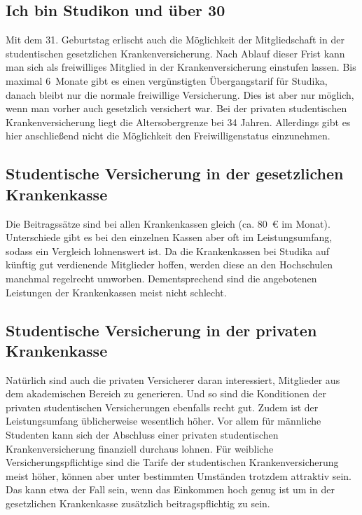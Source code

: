 \subsection*{Ich bin Studikon und über 30}

Mit dem 31. Geburtstag erlischt auch die Möglichkeit der
Mitgliedschaft in der studentischen gesetzlichen
Krankenversicherung. Nach Ablauf dieser Frist kann man sich 
als freiwilliges Mitglied in der Krankenversicherung einstufen lassen. 
Bis maximal 6~Monate gibt es einen vergünstigten Übergangstarif für
Studika, danach bleibt nur die normale freiwillige Versicherung.
Dies ist aber nur möglich, wenn
man vorher auch gesetzlich versichert war. Bei der privaten
studentischen Krankenversicherung liegt die Altersobergrenze bei 34
Jahren. Allerdings gibt es hier anschließend nicht die Möglichkeit den
Freiwilligenstatus einzunehmen.

\subsection*{Studentische Versicherung in der gesetzlichen Krankenkasse}

Die Beitragssätze sind bei allen Krankenkassen gleich (ca. 80~€ im
Monat). Unterschiede gibt es bei den einzelnen Kassen aber oft im
Leistungsumfang, sodass ein Vergleich lohnenswert ist. Da die Krankenkassen bei
Studika auf künftig gut verdienende Mitglieder hoffen, werden
diese an den Hochschulen manchmal regelrecht umworben. Dementsprechend
sind die angebotenen Leistungen der Krankenkassen meist nicht
schlecht.

\subsection*{Studentische Versicherung in der privaten Krankenkasse}

Natürlich sind auch die privaten Versicherer daran interessiert,
Mitglieder aus dem akademischen Bereich zu generieren. Und so sind die
Konditionen der privaten studentischen Versicherungen ebenfalls recht gut. Zudem ist der
Leistungsumfang üblicherweise wesentlich höher. Vor allem für
männliche Studenten kann sich der Abschluss einer privaten
studentischen Krankenversicherung finanziell durchaus lohnen. Für weibliche
Versicherungspflichtige sind die Tarife der
studentischen Krankenversicherung meist höher, können aber unter
bestimmten Umständen trotzdem attraktiv sein. Das kann etwa der Fall
sein, wenn das Einkommen hoch genug ist um in der gesetzlichen
Krankenkasse zusätzlich beitragspflichtig zu sein.

